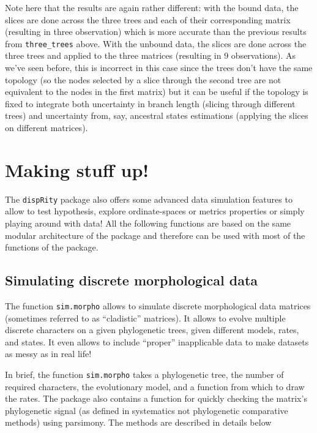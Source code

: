 \documentclass[]{book}
\begin{document}
Note here that the results are again rather different: with the bound data, the slices are done across the three trees and each of their corresponding matrix (resulting in three observation) which is more accurate than the previous results from \texttt{three\_trees} above.
With the unbound data, the slices are done across the three trees and applied to the three matrices (resulting in 9 observations).
As we've seen before, this is incorrect in this case since the trees don't have the same topology (so the nodes selected by a slice through the second tree are not equivalent to the nodes in the first matrix) but it can be useful if the topology is fixed to integrate both uncertainty in branch length (slicing through different trees) and uncertainty from, say, ancestral states estimations (applying the slices on different matrices).

\hypertarget{making-stuff-up}{%
\chapter{Making stuff up!}\label{making-stuff-up}}

The \texttt{dispRity} package also offers some advanced data simulation features to allow to test hypothesis, explore ordinate-spaces or metrics properties or simply playing around with data!
All the following functions are based on the same modular architecture of the package and therefore can be used with most of the functions of the package.

\hypertarget{simulating-discrete-morphological-data}{%
\section{Simulating discrete morphological data}\label{simulating-discrete-morphological-data}}

The function \texttt{sim.morpho} allows to simulate discrete morphological data matrices (sometimes referred to as ``cladistic'' matrices).
It allows to evolve multiple discrete characters on a given phylogenetic trees, given different models, rates, and states.
It even allows to include ``proper'' inapplicable data to make datasets as messy as in real life!

In brief, the function \texttt{sim.morpho} takes a phylogenetic tree, the number of required characters, the evolutionary model, and a function from which to draw the rates.
The package also contains a function for quickly checking the matrix's phylogenetic signal (as defined in systematics not phylogenetic comparative methods) using parsimony.
The methods are described in details below
\end{document}
